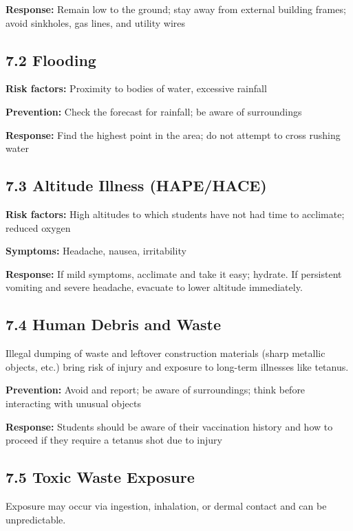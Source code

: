 \documentclass[
  11pt,
  letterpaper,
]{article}
\begin{document}
\textbf{Response:} Remain low to the ground; stay away from external
building frames; avoid sinkholes, gas lines, and utility wires

\subsection{7.2 Flooding}\label{flooding}

\textbf{Risk factors:} Proximity to bodies of water, excessive rainfall

\textbf{Prevention:} Check the forecast for rainfall; be aware of
surroundings

\textbf{Response:} Find the highest point in the area; do not attempt to
cross rushing water

\subsection{7.3 Altitude Illness
(HAPE/HACE)}\label{altitude-illness-hapehace}

\textbf{Risk factors:} High altitudes to which students have not had
time to acclimate; reduced oxygen

\textbf{Symptoms:} Headache, nausea, irritability

\textbf{Response:} If mild symptoms, acclimate and take it easy;
hydrate. If persistent vomiting and severe headache, evacuate to lower
altitude immediately.

\subsection{7.4 Human Debris and Waste}\label{human-debris-and-waste}

Illegal dumping of waste and leftover construction materials (sharp
metallic objects, etc.) bring risk of injury and exposure to long-term
illnesses like tetanus.

\textbf{Prevention:} Avoid and report; be aware of surroundings; think
before interacting with unusual objects

\textbf{Response:} Students should be aware of their vaccination history
and how to proceed if they require a tetanus shot due to injury

\subsection{7.5 Toxic Waste Exposure}\label{toxic-waste-exposure}

Exposure may occur via ingestion, inhalation, or dermal contact and can
be unpredictable.
\end{document}
